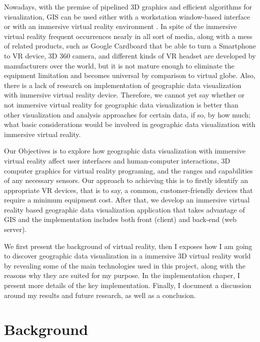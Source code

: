 Nowadays, with the premise of pipelined 3D graphics and efficient algorithms for visualization, GIS can be used either with a workstation window-based interface or with an immersive virtual reality environment \cite{koller.virtual-gis.1995}. In spite of the immersive virtual reality frequent occurrences nearly in all sort of media, along with a mess of related products, such as Google Cardboard that be able to turn a Smartphone to VR device, 3D 360 camera, and different kinds of VR headset are developed by manufacturers over the world, but it is not mature enough to eliminate the equipment limitation and becomes universal by comparison to virtual globe. Also, there is a lack of research on implementation of geographic data visualization with immersive virtual reality device. Therefore, we cannot yet say whether or not immersive virtual reality for geographic data visualization is better than other visualization and analysis approaches for certain data, if so, by how much; what basic considerations would be involved in geographic data visualization with immersive virtual reality.

Our Objectives is to explore how geographic data visualization with immersive virtual reality affect user interfaces and human-computer interactions, 3D computer graphics for virtual reality programing, and the ranges and capabilities of any necessary sensors. Our approach to achieving this is to firstly identify an appropriate VR devices, that is to say, a common, customer-friendly devices that require a minimum equipment cost. After that, we develop an immersive virtual reality based geographic data visualization application that takes advantage of GIS and the implementation includes both front (client) and back-end (web server).

We first present the background of virtual reality, then I exposes how I am going to discover geographic data visualization in a immersive 3D virtual reality world by revealing some of the main technologies used in this project, along with the reasons why they are suited for my purpose. In the implementation chaper, I present more details of the key implementation. Finally, I document a discussion around my results and future research, as well as a conclusion.

\section{Background}
\label{section:background}

